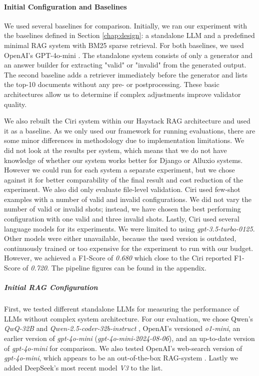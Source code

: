 \paragraph{Initial Configuration and Baselines} \label{sec:exp_initial_config}
We used several baselines for comparison. Initially, we ran our experiment with the baselines defined in Section \ref{chap:design}: a standalone LLM and a predefined minimal RAG system with BM25 sparse retrieval. For both baselines, we used OpenAI's GPT-4o-mini \cite{OpenAI_2022}. The standalone system consists of only a generator and an answer builder for extracting "valid" or "invalid" from the generated output. The second baseline adds a retriever immediately before the generator and lists the top-10 documents without any pre- or postprocessing. These basic architectures allow us to determine if complex adjustments improve validator quality.

We also rebuilt the Ciri system within our Haystack RAG architecture and used it as a baseline. As we only used our framework for running evaluations, there are some minor differences in methodology due to implementation limitations. We did not look at the results per system, which means that we do not have knowledge of whether our system works better for Django or Alluxio systems. However we could run for each system a separate experiment, but we chose against it for better comparability of the final result and cost reduction of the experiment. We also did only evaluate file-level validation. Ciri used few-shot examples with a number of valid and invalid configurations. We did not vary the number of valid or invalid shots; instead, we have chosen the best performing configuration with one valid and three invalid shots. Lastly, Ciri used several language models for its experiments. We were limited to using \textit{gpt-3.5-turbo-0125}\cite{OpenAI_2022}. Other models were either unavailable, because the used version is outdated, continuously trained or too expensive for the experiment to run with our budget. However, we achieved a F1-Score of \textit{0.680} which close to the Ciri reported F1-Score of \textit{0.720}. The pipeline figures can be found in the appendix.

\subparagraph{Initial RAG Configuration} 
First, we tested different standalone LLMs for measuring the performance of LLMs without complex system architecture. For our evaluation, we chose Qwen's \textit{QwQ-32B} \cite{qwq32b} and \textit{Qwen-2.5-coder-32b-instruct} \cite{hui2024qwen2}\cite{qwen2}\cite{qwen2.5}, OpenAI's versioned \textit{o1-mini}, an earlier version of \textit{gpt-4o-mini} (\textit{gpt-4o-mini-2024-08-06}), and an up-to-date version of \textit{gpt-4o-mini} for comparison. We also tested OpenAI's web-search version of \textit{gpt-4o-mini}, which appears to be an out-of-the-box RAG-system \cite{OpenAI_2022}. Lastly we added DeepSeek's most recent model \textit{V3} \cite{deepseekai2024deepseekv3technicalreport} to the list. 

